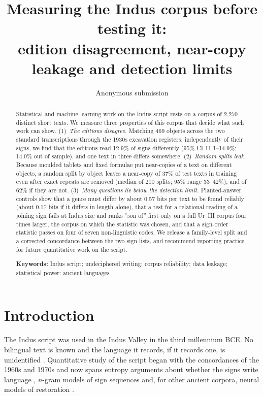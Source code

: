 \documentclass[11pt,a4paper]{article}
\title{\textbf{Measuring the Indus corpus before testing it:\\edition disagreement, near-copy leakage and detection limits}}
\author{Anonymous submission}
\date{}
\begin{document}
\maketitle

\begin{abstract}
\noindent Statistical and machine-learning work on the Indus script rests on a corpus of 2,270 distinct short texts. We measure three properties of this corpus that decide what such work can show. (1)~\emph{The editions disagree.} Matching 469 objects across the two standard transcriptions through the 1930s excavation registers, independently of their signs, we find that the editions read 12.9\% of signs differently (95\% CI 11.1--14.9\%; 14.0\% out of sample), and one text in three differs somewhere. (2)~\emph{Random splits leak.} Because moulded tablets and fixed formulae put near-copies of a text on different objects, a random split by object leaves a near-copy of 37\% of test texts in training even after exact repeats are removed (median of 200 splits; 95\% range 33--42\%), and of 62\% if they are not. (3)~\emph{Many questions lie below the detection limit.} Planted-answer controls show that a genre must differ by about 0.57 bits per text to be found reliably (about 0.17 bits if it differs in length alone), that a test for a relational reading of a joining sign fails at Indus size and ranks ``son of'' first only on a full Ur~III corpus four times larger, the corpus on which the statistic was chosen, and that a sign-order statistic passes on four of seven non-linguistic codes. We release a family-level split and a corrected concordance between the two sign lists, and recommend reporting practice for future quantitative work on the script.

\medskip
\noindent\textbf{Keywords:} Indus script; undeciphered writing; corpus reliability; data leakage; statistical power; ancient languages
\end{abstract}

\section{Introduction}

The Indus script was used in the Indus Valley in the third millennium BCE. No bilingual text is known and the language it records, if it records one, is unidentified \citep{parpola1994}. Quantitative study of the script began with the concordances of the 1960s and 1970s \citep{mahadevan1977} and now spans entropy arguments about whether the signs write language \citep{rao2009,sproat2014}, $n$-gram models of sign sequences \citep{yadav2010} and, for other ancient corpora, neural models of restoration \citep{assael2022,sommerschield2023}.
\end{document}
